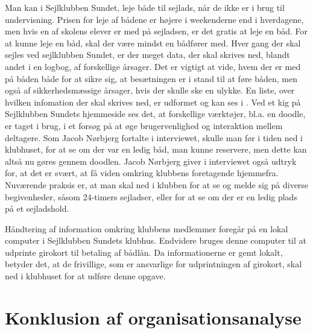 Man kan i Sejlklubben Sundet, leje både til sejlads, når de ikke er i brug til undervisning. 
Prisen for leje af bådene er højere i weekenderne end i hverdagene, men hvis en af skolens elever er med på sejladsen, er det gratis at leje en båd. 
For at kunne leje en båd, skal der være mindst en bådfører med.
Hver gang der skal sejles ved sejlklubben Sundet, er der meget data, der skal skrives ned, blandt andet i en logbog, af forskellige årsager. 
Det er vigtigt at vide, hvem der er med på båden både for at sikre sig, at besætningen er i stand til at føre båden, men også af sikkerhedsmæssige årsager, hvis der skulle ske en ulykke. 
En liste, over hvilken infomation der skal skrives ned, er udformet og kan ses i . 
Ved et kig på Sejlklubben Sundets hjemmeside \citep{SundetUdlaan} ses det, at forskellige værktøjer, bl.a. en doodle, er taget i brug, i et forsøg på at øge brugervenlighed og interaktion mellem deltagere. 
Som Jacob Nørbjerg fortalte i interviewet, skulle man før i tiden ned i klubhuset, for at se om der var en ledig båd, man kunne reservere, men dette kan altså nu gøres gennem doodlen. 
Jacob Nørbjerg giver i interviewet også udtryk for, at det er svært, at få viden omkring klubbens foretagende hjemmefra. 
Nuværende praksis er, at man skal ned i klubben for at se og melde sig på diverse begivenheder, såsom 24-timers sejladser, eller for at se om der er en ledig plads på et sejladshold.

Håndtering af information omkring klubbens medlemmer foregår på en lokal computer i Sejlklubben Sundets
klubhus. 
Endvidere bruges denne computer til at udprinte girokort til betaling af bådlån. 
Da informationerne er gemt lokalt, betyder det, at de frivillige, som er ansvarlige for udprintningen af girokort, skal ned i klubhuset for at udføre denne opgave.


\section{Konklusion af organisationsanalyse}\label{sec:organisation-konklusion}

